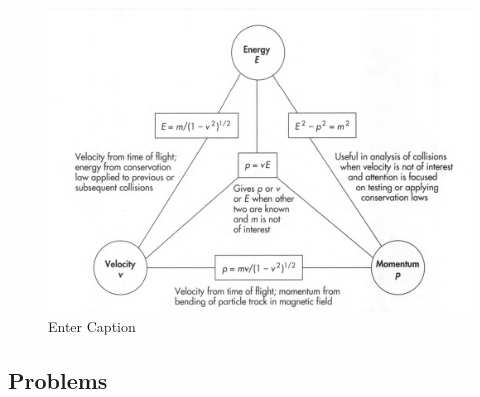 \documentclass[12pt]{book}
\begin{document}
\begin{figure}[!h]
    \centering
    \includegraphics[width=0.5\linewidth]{picture/Momenergy relationship.png}
    \caption{Enter Caption}
    \label{fig:pEconv}
\end{figure}

\subsection{Problems}
\end{document}
